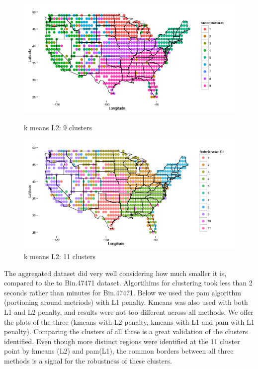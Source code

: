 \documentclass{article}\usepackage[]{graphicx}\usepackage[]{color}
\begin{document}
\begin{figure}[H]
\begin{minipage}{.5\textwidth}
\includegraphics[width=250pts, height=150pts]{9clustersmall.png}
\caption{k means L2: 9 clusters}
\end{minipage}
\begin{minipage}{.5\textwidth}
\includegraphics[width=250pts, height=150pts]{11clustersmall.png}
\caption{k means L2: 11 clusters}
\end{minipage}

\end{figure}

The aggregated dataset did very well considering how much smaller it is, compared to the to Bin.47471 dataset.  Algortihims for clustering took less than 2 seconds rather than minutes for Bin.47471. Below we used the pam algorithm (portioning around metriods) with L1 penalty. Kmeans was also used with both L1 and L2 penalty, and results were not too different across all methods.  We offer the plots of the three (kmeans with L2 penalty, kmeans with L1 and pam with L1 penalty).  Comparing the clusters of all three is a great validation of the clusters identified.  Even though more distinct regions were identified at the 11 cluster point by kmeans (L2) and pam(L1), the common borders between all three methods is a signal for the robustness of these clusters.  
\end{document}
